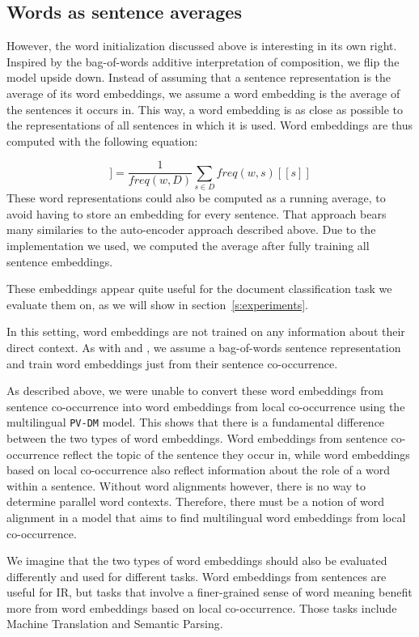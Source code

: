 % 



\subsection{Words as sentence averages}

However, the word initialization discussed above is interesting in its own right.
Inspired by the bag-of-words additive interpretation of composition, we flip the model upside down.
Instead of assuming that a sentence representation is the average of its word embeddings, we assume a word embedding is the average of the sentences it occurs in.
This way, a word embedding is as close as possible to the representations of all sentences in which it is used.
Word embeddings are thus computed with the following equation:

\begin{equation*}
[\![ w ]\!] =\frac{1}{freq(w,D)}\sum_{s\in D}freq(w,s) [\![ s ]\!]
\end{equation*}
These word representations could also be computed as a running average, to avoid having to store an embedding for every sentence.
That approach bears many similaries to the auto-encoder approach described above.
Due to the implementation we used, we computed the average after fully training all sentence embeddings.

These embeddings appear quite useful for the document classification task we evaluate them on, as we will show in section~\ref{s:experiments}.

In this setting, word embeddings are not trained on any information about their direct context. 
As with \cite{hermann2013multilingual} and \cite{SarathChandar2014autoencoder}, we assume a bag-of-words sentence representation and train word embeddings just from their sentence co-occurrence.

As described above, we were unable to convert these word embeddings from sentence co-occurrence into word embeddings from local co-occurrence using the multilingual \texttt{PV-DM} model.
This shows that there is a fundamental difference between the two types of word embeddings.
Word embeddings from sentence co-occurrence reflect the topic of the sentence they occur in, while word embeddings based on local co-occurrence also reflect information about the role of a word within a sentence.
Without word alignments however, there is no way to determine parallel word contexts.
Therefore, there must be a notion of word alignment in a model that aims to find multilingual word embeddings from local co-occurrence.

We imagine that the two types of word embeddings should also be evaluated differently and used for different tasks.
Word embeddings from sentences are useful for IR, but tasks that involve a finer-grained sense of word meaning benefit more from word embeddings based on local co-occurrence.
Those tasks include Machine Translation and Semantic Parsing.